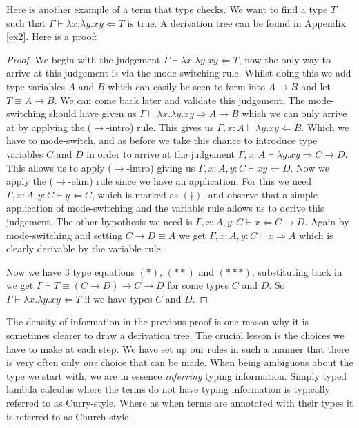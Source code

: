 \begin{example}\label{fun_app}
    Here is another example of a term that type checks. We want to find a type $T$ such that $\Gamma \vdash \lambda x . \lambda y . x y \Leftarrow T$ is true. A derivation tree can be found in Appendix \ref{ex2}. Here is a proof:
        
    \begin{proof}
        We begin with the judgement $\Gamma \vdash \lambda x . \lambda y . x y \Leftarrow T$, now the only way to arrive at this judgement is via the mode-switching rule.
        Whilst doing this we add type variables $A$ and $B$ which can easily be seen to form into $A \to B$ and let $T \equiv A \to B$.
        We can come back later and validate this judgement.
        The mode-switching should have given us $\Gamma \vdash \lambda x . \lambda y . x y \Rightarrow A \to B$ which we can only arrive at by applying the ($\to$-intro) rule. This gives us $\Gamma , x : A \vdash \lambda y . xy \Leftarrow B$.
        Which we have to mode-switch, and as before we take this chance to introduce type variables $C$ and $D$ in order to arrive at the judgement $\Gamma , x : A \vdash \lambda y . x y \Rightarrow C \to D$.
        This allows us to apply ($\to$-intro) giving us $\Gamma , x : A , y : C \vdash xy \Leftarrow D$.
        Now we apply the ($\to$-elim) rule since we have an application.
        For this we need $\Gamma , x : A, y : C \vdash y \Leftarrow C$, which is marked as $(\dagger)$, and observe that a simple application of mode-switching and the variable rule allows us to derive this judgement.
        The other hypothesis we need is $\Gamma , x : A, y : C \vdash x \Leftarrow C \to D$.
        Again by mode-switching and setting $C \to D \equiv A$ we get $\Gamma , x : A, y : C \vdash x \Rightarrow A$ which is clearly derivable by the variable rule.
            
        Now we have 3 type equations $(*)$, $(**)$ and $(***)$, substituting back in we get $\Gamma \vdash T \equiv (C \to D) \to C \to D$ for some types $C$ and $D$. So $\Gamma \vdash \lambda x . \lambda y . x y \Leftarrow T$ if we have types $C$ and $D$.
    \end{proof}
\end{example}

\begin{remark}
    The density of information in the previous proof is one reason why it is sometimes clearer to draw a derivation tree. The crucial lesson is the choices we have to make at each step. We have set up our rules in such a manner that there is very often only \emph{one} choice that can be made. When being ambiguous about the type we start with, we are in essence \emph{inferring} typing information. Simply typed lambda calculus where the terms do not have typing information is typically referred to as Curry-style. Where as when terms are annotated with their types it is referred to as Church-style \cite{Sorensen}.
\end{remark}

